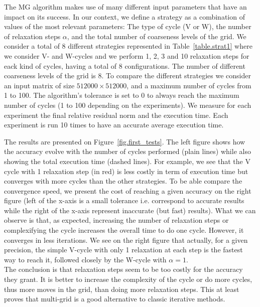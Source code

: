 The MG algorithm makes use of many different input parameters that have an impact on its success. 
In our context, we define a strategy as a combination of values of the most relevant parameters: The type of cycle (V or W), the number of relaxation steps $\alpha$, and the total number of coarseness levels of the grid. 
We consider a total of 8 different strategies represented in Table~\ref{table.strat1} where we consider V- and W-cycles and we perform 1, 2, 3 and 10 relaxation steps for eack kind of cycles, having a total of 8 configurations. 
The number of different coarseness levels of the grid is 8.
To compare the different strategies we consider an input matrix of size $512000 \times 512000$, 
and a maximum number of cycles from 1 to 100.
The algorithm's tolerance is set to $0$ to always reach the maximum number of cycles (1 to 100 depending on the experiments).
We measure for each experiment the final relative residual norm and the execution time. 
Each experiment is run 10 times to have an accurate average execution time.

The results are presented on Figure~\ref{fig.first_tests}.
The left figure shows how the accuracy evolve with the number of cycles performed (plain lines) while also showing the total execution time (dashed lines). For example, we see that the V cycle with 1 relaxation step (in red) is less costly in term of execution time but converges with more cycles than the other strategies. To be able compare the convergence speed, we present the cost of reaching
a given accuracy on the right figure (left of the x-axis is a small tolerance i.e. correspond to accurate results while the right of the x-axis represent inaccurate (but fast) results).
What we can observe is that, as expected, increasing the number of relaxation steps or complexifying the cycle increases the overall time to do one cycle. However, it converges in less iterations.
We see on the right figure that actually, for a given precision, the simple V-cycle with only 1 relaxation at each step is the fastest way to reach it, followed closely by the W-cycle with $\alpha=1$.\\
The conclusion is that relaxation steps seem to be too costly for the accuracy they grant. It is better to increase the complexity of the cycle or do more cycles, thus more moves in the grid, than doing more relaxation steps. This at least proves
that multi-grid is a good alternative to classic iterative methods.

